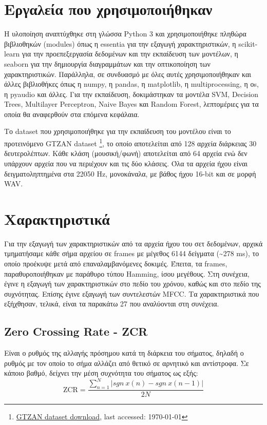 \section{Εργαλεία που χρησιμοποιήθηκαν}

Η υλοποίηση αναπτύχθηκε στη γλώσσα Python 3 και χρησιμοποιήθηκε πληθώρα βιβλιοθηκών (modules) όπως η essentia για την εξαγωγή χαρακτηριστικών, η scikit-learn για την προεπεξεργασία δεδομένων και την εκπαίδευση των μοντέλων, η seaborn για την δημιουργία διαγραμμάτων και την οπτικοποίηση των χαρακτηριστικών. Παράλληλα, σε συνδυασμό με όλες αυτές χρησιμοποιήθηκαν και άλλες βιβλιοθήκες όπως η numpy, η pandas, η matplotlib, η multiprocessing, η οs, η pyaudio και άλλες. Για την εκπαίδευση, δοκιμάστηκαν τα μοντέλα SVM, Decision Trees, Multilayer Perceptron, Naive Bayes και Random Forest, λεπτομέριες για τα οποία θα αναφερθούν στα επόμενα κεφάλαια.

Το dataset που χρησιμοποιήθηκε για την εκπαίδευση του μοντέλου είναι το προτεινόμενο GTZAN dataset \footnote{\href{http://opihi.cs.uvic.ca/sound/music_speech.tar.gz}{GTZAN dataset download}, last accessed: \today}, το οποίο αποτελείται από 128 αρχεία διάρκειας 30 δευτερολέπτων. Κάθε κλάση (μουσική/φωνή) αποτελείται από 64 αρχεία ενώ δεν υπάρχουν αρχεία που να περιέχουν και τις δύο κλάσεις. Όλα τα αρχεία ήχου είναι δειγματοληπτημένα στα 22050 Hz, μονοκάναλα, με βάθος ήχου 16-bit και σε μορφή WAV.

\section{Χαρακτηριστικά}

Για την εξαγωγή των χαρακτηριστικών από τα αρχεία ήχου του σετ δεδομένων, αρχικά τμηματήσαμε κάθε σήμα αρχείου σε frames με μέγεθος 6144 δείγματα (\textasciitilde278 ms), το οποίο προέκυψε μετά από επαναλαμβανόμενες δοκιμές. Έπειτα, τα frames, παραθυροποιήθηκαν με παράθυρο τύπου Hamming, ίσου μεγέθους. Στη συνέχεια, έγινε η εξαγωγή των χαρακτηριστικών στο πεδίο του χρόνου, καθώς και στο πεδίο της συχνότητας. Επίσης έγινε εξαγωγή των συντελεστών MFCC. Τα χαρακτηριστικά που εξήχθησαν, τελικά, είναι τα παρακάτω 27 που αναλύονται στη συνέχεια.

\subsection{Zero Crossing Rate - ZCR}

Είναι ο ρυθμός της αλλαγής πρόσημου κατά τη διάρκεια του σήματος, δηλαδή ο ρυθμός με τον οποίο το σήμα αλλάζει από θετικό σε αρνητικό και αντίστροφα. Σε κάποιο βαθμό, δείχνει την μέση συχνότητα του σήματος ως εξής:
\begin{equation}
\text{ZCR} = \frac{\sum_{n=1}^{N} |sgn ~x(n) - sgn~x(n-1)|}{2N}
\end{equation}

